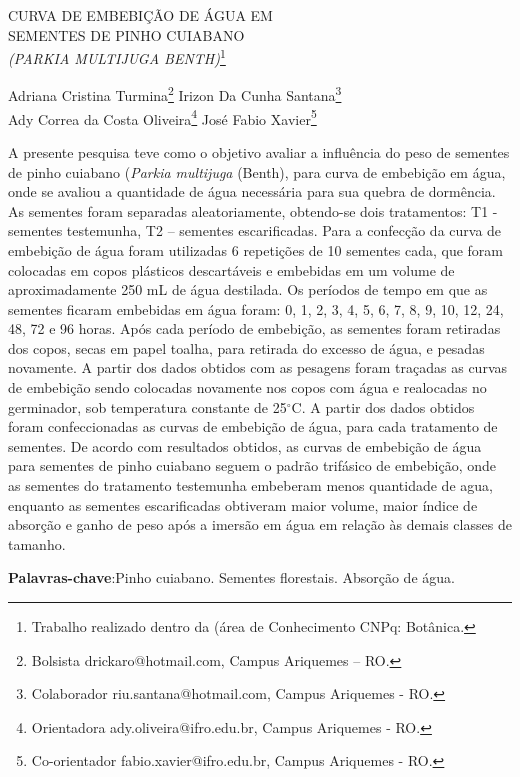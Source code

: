 \documentclass[article,12pt,onesidea,4paper,english,brazil]{abntex2}
\begin{document}
	
	
	\frenchspacing 
	
	\begin{center}
		\LARGE CURVA DE EMBEBIÇÃO DE ÁGUA EM \\SEMENTES DE PINHO CUIABANO\\
		\MakeUppercase{\textit{(Parkia multijuga benth)}}\footnote{Trabalho realizado dentro da (área de Conhecimento CNPq: Botânica.}
		
		\normalsize
	Adriana Cristina Turmina\footnote{Bolsista drickaro@hotmail.com, Campus Ariquemes – RO.} 
	Irizon Da Cunha Santana\footnote{Colaborador riu.santana@hotmail.com, Campus Ariquemes - RO.} \\
		Ady Correa da Costa Oliveira\footnote{Orientadora ady.oliveira@ifro.edu.br, Campus Ariquemes - RO.} 
		José Fabio
		Xavier\footnote{Co-orientador fabio.xavier@ifro.edu.br, Campus Ariquemes - RO.} 
	\end{center}
	
	\noindent A presente pesquisa teve como o objetivo avaliar a influência do peso de sementes
	de pinho cuiabano (\textit{Parkia multijuga} (Benth), para curva de embebição em água,
	onde se avaliou a quantidade de água necessária para sua quebra de dormência. As sementes foram separadas aleatoriamente, obtendo-se dois tratamentos: T1 -
	sementes testemunha, T2 – sementes escarificadas. Para a confecção da curva de embebição de água foram utilizadas 6 repetições de 10 sementes cada, que foram colocadas em copos plásticos descartáveis e embebidas em um volume de aproximadamente 250 mL de água destilada. Os períodos de tempo em que as
	sementes ficaram embebidas em água foram: 0, 1, 2, 3, 4, 5, 6, 7, 8, 9, 10, 12, 24, 48, 72 e 96 horas. Após cada período de embebição, as sementes foram retiradas dos copos, secas em papel toalha, para retirada do excesso de água, e pesadas novamente. A partir dos dados obtidos com as pesagens foram traçadas as curvas
	de embebição sendo colocadas novamente nos copos com água e realocadas no germinador, sob temperatura constante de 25$^\circ$C. A partir dos dados obtidos foram
	confeccionadas as curvas de embebição de água, para cada tratamento de sementes. De acordo com resultados obtidos, as curvas de embebição de água para sementes de pinho cuiabano seguem o padrão trifásico de embebição, onde as
	sementes do tratamento testemunha embeberam menos quantidade de agua, enquanto as sementes escarificadas obtiveram maior volume, maior índice de absorção e ganho de peso após a imersão em água em relação às demais classes de tamanho.
	
	\vspace{\onelineskip}
	
	\noindent
	\textbf{Palavras-chave}:Pinho cuiabano. Sementes florestais. Absorção de água.
	
\end{document}
